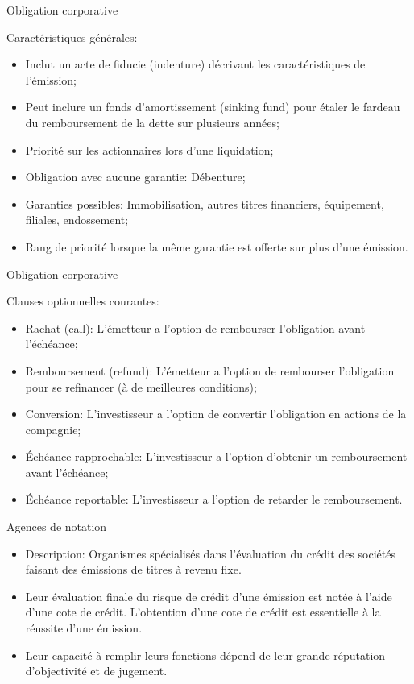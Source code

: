 \documentclass{beamer}
\begin{document}
\begin{frame}{Obligation corporative}
\begin{block}{Caractéristiques générales:}
\begin{itemize}
\item Inclut un acte de fiducie (indenture) décrivant les caractéristiques de l’émission;
\item Peut inclure un fonds d’amortissement (sinking fund) pour étaler le fardeau du remboursement de la dette sur plusieurs années;
\item Priorité sur les actionnaires lors d’une liquidation;
\item Obligation avec aucune garantie: Débenture;
\item Garanties possibles: Immobilisation, autres titres financiers, équipement, filiales, endossement;
\item Rang de priorité lorsque la même garantie est offerte sur plus d’une émission.
\end{itemize}
\end{block}
\end{frame}



\begin{frame}{Obligation corporative}
\begin{block}{Clauses optionnelles courantes:}
\begin{itemize}
\item Rachat (call): L’émetteur a l’option de rembourser l’obligation avant l’échéance;
\item Remboursement (refund): L’émetteur a l’option de rembourser l’obligation pour se refinancer (à de meilleures conditions);
\item Conversion: L’investisseur a l’option de convertir l’obligation en actions de la compagnie;
\item Échéance rapprochable: L’investisseur a l’option d’obtenir un remboursement avant l’échéance;
\item Échéance reportable: L’investisseur a l’option de retarder le remboursement.
\end{itemize}
\end{block}
\end{frame}

\begin{frame}{Agences de notation}
\begin{itemize}
\item Description: Organismes spécialisés dans l’évaluation du crédit des sociétés faisant des émissions de titres à revenu fixe.
\item Leur évaluation finale du risque de crédit d’une émission est notée à l’aide d’une cote de crédit. L’obtention d’une cote de crédit est essentielle à la réussite d’une émission. 
\item Leur capacité à remplir leurs fonctions dépend de leur grande réputation d’objectivité et de jugement.
\end{itemize}
\end{frame}
\end{document}
